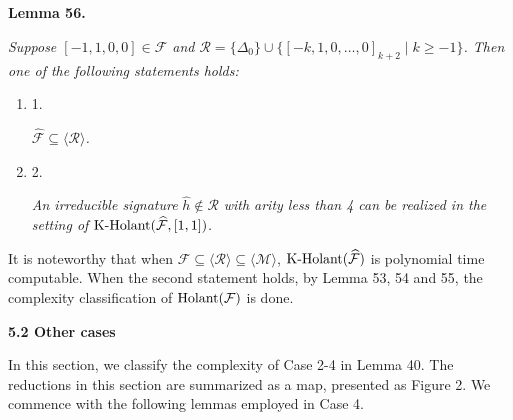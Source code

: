 \documentclass[10pt,a4paper]{article}
\begin{document}
\par\medskip\noindent\textbf{
\textbf{Lemma 56}\textbf{.}
}\par



\emph{Suppose $[-1,1,0,0]\in\widehat{\mathcal{F}}$ and $\mathcal{R}=\{\Delta_{0}\}\cup\{[-k,1,0,\ldots,0]_{k+2}\mid k\geq-1\}$. Then one of the following statements holds:}\par


\begin{enumerate}


\item[] 
1. 


$\widehat{\mathcal{F}}\subseteq\langle\mathcal{R}\rangle$\emph{.}\par





\item[] 
2. 


\emph{An irreducible signature }$\widehat{h}\notin\mathcal{R}$\emph{ with arity less than 4 can be realized in the setting of }$\textup{{K-Holant}}(\widehat{\mathcal{F}},[1,1])$\emph{.}\par





\end{enumerate}






It is noteworthy that when $\widehat{\mathcal{F}}\subseteq\langle\mathcal{R}\rangle\subseteq\langle\mathcal{M}\rangle$, $\textup{{K-Holant}}(\widehat{\mathcal{F}})$ is polynomial time computable. When the second statement holds, by Lemma 53, 54 and 55, the complexity classification of $\textup{{Holant}}(\mathcal{F})$ is done.\par





\par\medskip\noindent\textbf{
5.2 Other cases}\par




In this section, we classify the complexity of Case 2-4 in Lemma 40. The reductions in this section are summarized as a map, presented as Figure 2. We commence with the following lemmas employed in Case 4.\par
\end{document}

